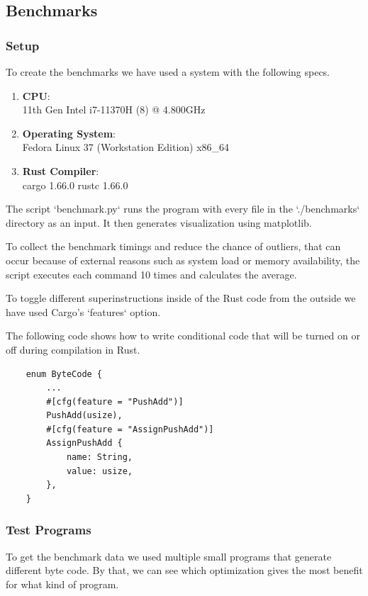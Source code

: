 \documentclass{article}
\begin{document}
\subsection{Benchmarks}
\subsubsection{Setup}

To create the benchmarks we have used a system with the following specs.

\begin{enumerate}
    \item \textbf{CPU}:\\
        11th Gen Intel i7-11370H (8) @ 4.800GHz 
    \item \textbf{Operating System}:\\
        Fedora Linux 37 (Workstation Edition) x86\_64 
    \item \textbf{Rust Compiler}:\\
        cargo 1.66.0
        rustc 1.66.0
\end{enumerate}

The script `benchmark.py` runs the program with every file in the
`./benchmarks` directory as an input. It then generates visualization using
matplotlib.

To collect the benchmark timings and reduce the chance of outliers, that can
occur because of external reasons such as system load or memory availability,
the script executes each command 10 times and calculates the average.

To toggle different superinstructions inside of the Rust code from the 
outside we have used Cargo's `features` option.

The following code shows how to write conditional code that will be turned on
or off during compilation in Rust.

\begin{verbatim}
    enum ByteCode {
        ...
        #[cfg(feature = "PushAdd")]
        PushAdd(usize),
        #[cfg(feature = "AssignPushAdd")]
        AssignPushAdd {
            name: String,
            value: usize,
        },
    }
\end{verbatim}

\subsubsection{Test Programs}
To get the benchmark data we used multiple small programs that generate
different byte code. By that, we can see which optimization gives the most
benefit for what kind of program.
\end{document}
